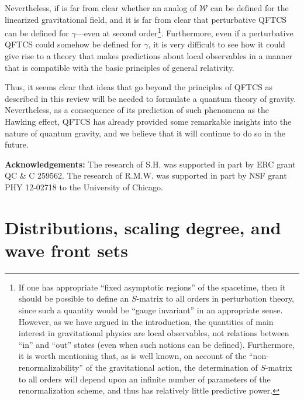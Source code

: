 \documentclass[12pt]{article}
\newcommand{\eW}{\mathscr{W}}
\theoremstyle{plain}
\theoremstyle{definition}
\begin{document}
Nevertheless, if is far from clear whether an analog of $\eW$ can be defined for the linearized gravitational field,
and it is far from clear that perturbative QFTCS can be defined for $\gamma$---even at second order\footnote{If one
has appropriate ``fixed asymptotic regions'' of the spacetime, then it should be possible to define an $S$-matrix
to all orders in perturbation theory, since such a quantity would be ``gauge invariant'' in an appropriate sense. However,
as we have argued in the introduction, the quantities of main interest in gravitational physics are local observables, not relations between ``in'' and ``out'' states (even when such notions can be defined). Furthermore, it is worth mentioning that, as is well known, on account of the ``non-renormalizability'' of the gravitational action, the determination of $S$-matrix to all orders will depend upon an infinite number of parameters of the renormalization scheme, and thus has relatively little predictive power.}. Furthermore, even if a perturbative QFTCS could somehow be defined for $\gamma$,
it is very difficult to see how it could give rise to a theory that makes predictions about local observables in a
manner that is compatible with the basic principles of general relativity.

Thus, it seems clear that ideas that go beyond the principles of
QFTCS as described in this review will be needed to formulate a quantum theory of gravity. Nevertheless,
as a consequence of its prediction of such phenomena as the Hawking effect,
QFTCS has already provided some remarkable insights into the nature of quantum gravity, and we believe that
it will continue to do so in the future.


\vspace{1cm}
\noindent
{\bf Acknowledgements:} The research of S.H. was supported in part by ERC grant QC \& C 259562. 
The research of R.M.W. was supported in part by NSF grant PHY 12-02718 to the University of Chicago.

\appendix

\section{Distributions, scaling degree, and wave front sets}
\label{appA}
\end{document}
